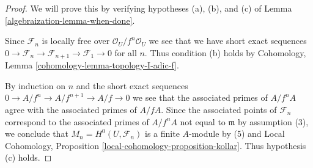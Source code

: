 \begin{proof}

We will prove this by verifying hypotheses (a), (b), and (c) of
Lemma \ref{algebraization-lemma-when-done}.

\medskip\noindent
Since $\mathcal{F}_n$ is locally free over $\mathcal{O}_U/f^n\mathcal{O}_U$
we see that we have short exact sequences
$0 \to \mathcal{F}_n \to \mathcal{F}_{n + 1} \to \mathcal{F}_1 \to 0$
for all $n$. Thus condition (b) holds by
Cohomology, Lemma \ref{cohomology-lemma-topology-I-adic-f}.

\medskip\noindent
By induction on $n$ and the short exact sequences
$0 \to A/f^n \to A/f^{n + 1} \to A/f \to 0$ we see that
the associated primes of $A/f^nA$ agree with the associated
primes of $A/fA$. Since the associated points of $\mathcal{F}_n$
correspond to the associated primes of $A/f^nA$ not equal to $\mathfrak m$
by assumption (3), we conclude that
$M_n = H^0(U, \mathcal{F}_n)$ is a finite $A$-module by (5) and
Local Cohomology, Proposition \ref{local-cohomology-proposition-kollar}.
Thus hypothesis (c) holds.


\end{proof}
